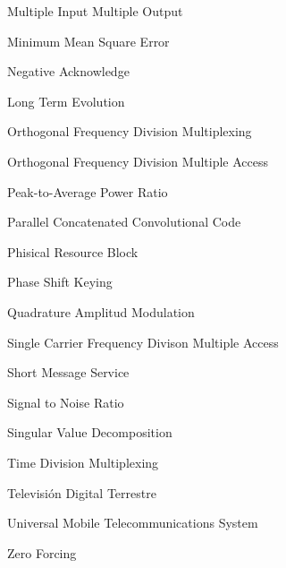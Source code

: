 \begin{enumerate}
\begin{minipage}{0.7\linewidth}
     	\item[] Multiple Input Multiple Output
     	\item[] Minimum Mean Square Error
      	\item[] Negative Acknowledge
      	\item[] Long Term Evolution
     	\item[] Orthogonal Frequency Division Multiplexing
        \item[] Orthogonal Frequency Division Multiple Access
        \item[] Peak-to-Average Power Ratio
        \item[] Parallel Concatenated Convolutional Code
        \item[] Phisical Resource Block
        \item[] Phase Shift Keying
        \item[] Quadrature Amplitud Modulation
        \item[] Single Carrier Frequency Divison Multiple Access
        \item[] Short Message Service
        \item[] Signal to Noise Ratio
        \item[] Singular Value Decomposition
        \item[] Time Division Multiplexing
        \item[] Televisión Digital Terrestre
        \item[] Universal Mobile Telecommunications System
        \item[] Zero Forcing
     \end{minipage}
\end{enumerate}
